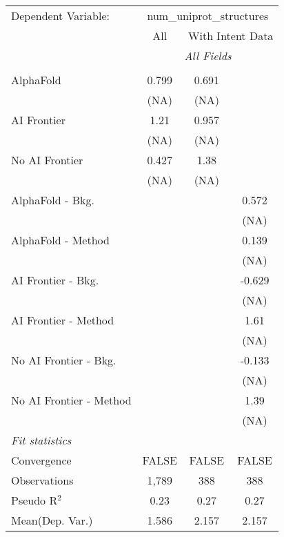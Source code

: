\begingroup
\centering
\begin{tabular}{lccc}
   \tabularnewline \midrule \midrule
   Dependent Variable: & \multicolumn{3}{c}{num\_uniprot\_structures}\\
 & \multicolumn{1}{c}{All} & \multicolumn{2}{c}{With Intent Data} \\
\cmidrule(lr){2-2} \cmidrule(lr){3-4}
 & \multicolumn{3}{c}{\textit{All Fields}} \\ \\
   AlphaFold               & 0.799 & 0.691 &   \\   
                           & (NA)  & (NA)  &   \\   
   AI Frontier             & 1.21  & 0.957 &   \\   
                           & (NA)  & (NA)  &   \\   
   No AI Frontier          & 0.427 & 1.38  &   \\   
                           & (NA)  & (NA)  &   \\   
   AlphaFold - Bkg.        &       &       & 0.572\\   
                           &       &       & (NA)\\   
   AlphaFold - Method      &       &       & 0.139\\   
                           &       &       & (NA)\\   
   AI Frontier - Bkg.      &       &       & -0.629\\   
                           &       &       & (NA)\\   
   AI Frontier - Method    &       &       & 1.61\\   
                           &       &       & (NA)\\   
   No AI Frontier - Bkg.   &       &       & -0.133\\   
                           &       &       & (NA)\\   
   No AI Frontier - Method &       &       & 1.39\\   
                           &       &       & (NA)\\   
   \midrule
   \emph{Fit statistics}\\
   Convergence             &FALSE  & FALSE & FALSE\\  
   Observations            & 1,789 & 388   & 388\\  
   Pseudo R$^2$            & 0.23  & 0.27  & 0.27\\  
Mean(Dep. Var.) & 1.586 & 2.157 & 2.157 \\
   

\end{tabular}
